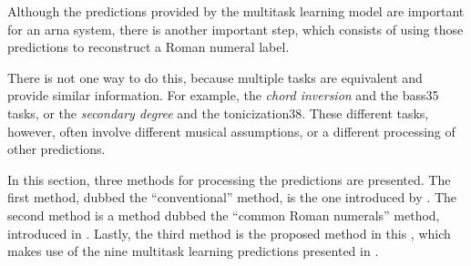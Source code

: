 
Although the predictions provided by the multitask learning
model are important for an \gls{arna} system, there is
another important step, which consists of using those
predictions to reconstruct a Roman numeral label.

There is not one way to do this, because multiple tasks are
equivalent and provide similar information. For example, the
\emph{chord inversion} and the \gls{bass35} tasks, or the
\emph{secondary degree} and the \gls{tonicization38}. These
different tasks, however, often involve different musical
assumptions, or a different processing of other predictions.

In this section, three methods for processing the
predictions are presented. The first method, dubbed the
``conventional'' method, is the one introduced by
\textcite{chen2018functional}. The second method is a method
dubbed the ``common Roman numerals'' method, introduced in
\textcite{napoleslopez2021augmentednet}. Lastly, the third
method is the proposed method in this \thesisdiss{}, which
makes use of the nine multitask learning predictions
presented in .





